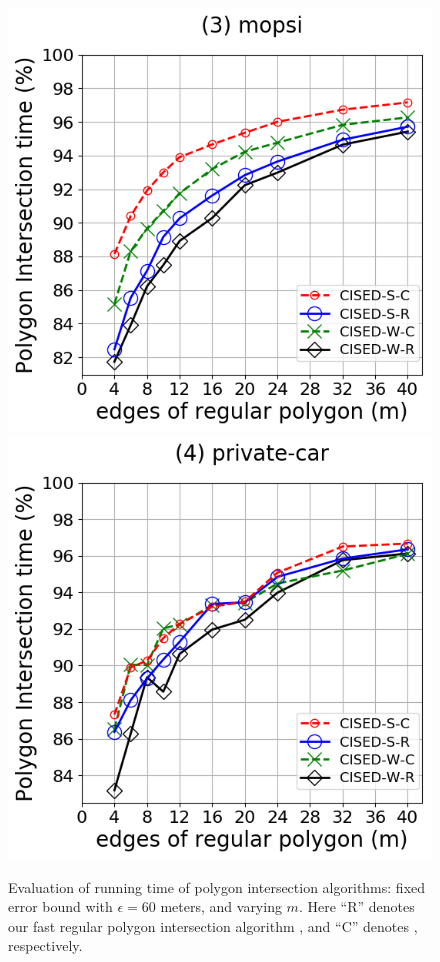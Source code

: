 \begin{figure}[tb!]
	\includegraphics[scale = 0.3]{Figures/Exp-M-poly-time-ratio-mopsi.png}
	\includegraphics[scale = 0.3]{Figures/Exp-M-poly-time-ratio-private.png}
	\caption{\small Evaluation of running time of polygon intersection algorithms: fixed error bound with $\epsilon=60$ meters, and varying $m$. Here ``R'' denotes our fast regular polygon intersection algorithm \rpia, and ``C'' denotes \cpia, respectively.}
	\label{fig:m-poly-time}
\end{figure}


